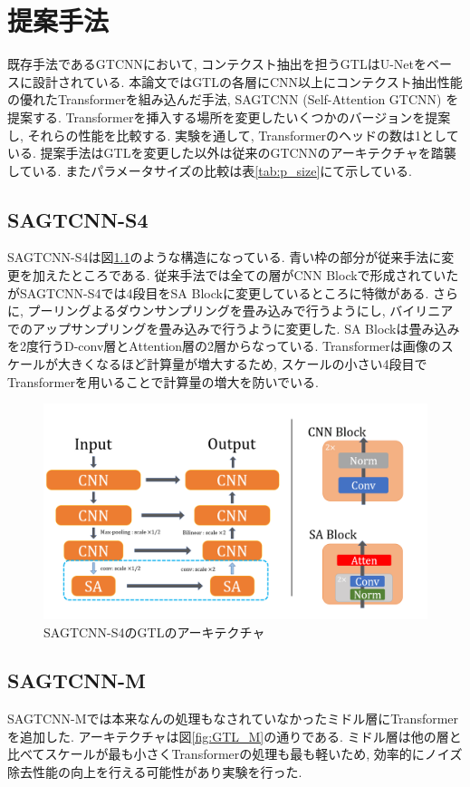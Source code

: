 \chapter{提案手法}
既存手法であるGTCNNにおいて, コンテクスト抽出を担うGTLはU-Netをベースに設計されている. 本論文ではGTLの各層にCNN以上にコンテクスト抽出性能の優れたTransformerを組み込んだ手法, SAGTCNN (Self-Attention GTCNN) を提案する. Transformerを挿入する場所を変更したいくつかのバージョンを提案し, それらの性能を比較する. 実験を通して, Transformerのヘッドの数は1としている. 提案手法はGTLを変更した以外は従来のGTCNNのアーキテクチャを踏襲している. またパラメータサイズの比較は表\ref{tab:p_size}にて示している.

\section{SAGTCNN-S4}
SAGTCNN-S4は図\ref{fig:GTL_S4}のような構造になっている. 青い枠の部分が従来手法に変更を加えたところである. 従来手法では全ての層がCNN Blockで形成されていたがSAGTCNN-S4では4段目をSA Blockに変更しているところに特徴がある. さらに, プーリングよるダウンサンプリングを畳み込みで行うようにし, バイリニアでのアップサンプリングを畳み込みで行うように変更した. SA Blockは畳み込みを2度行うD-conv層とAttention層の2層からなっている. Transformerは画像のスケールが大きくなるほど計算量が増大するため, スケールの小さい4段目でTransformerを用いることで計算量の増大を防いでいる. 

\begin{figure}[htbp]
\centering
\includegraphics[scale=0.4]{figures/GTL_TS4.png}
\caption{SAGTCNN-S4のGTLのアーキテクチャ　\label{fig:GTL_S4}}
\end{figure}

\newpage
\section{SAGTCNN-M}
SAGTCNN-Mでは本来なんの処理もなされていなかったミドル層にTransformerを追加した. アーキテクチャは図\ref{fig:GTL_M}の通りである. ミドル層は他の層と比べてスケールが最も小さくTransformerの処理も最も軽いため, 効率的にノイズ除去性能の向上を行える可能性があり実験を行った.

